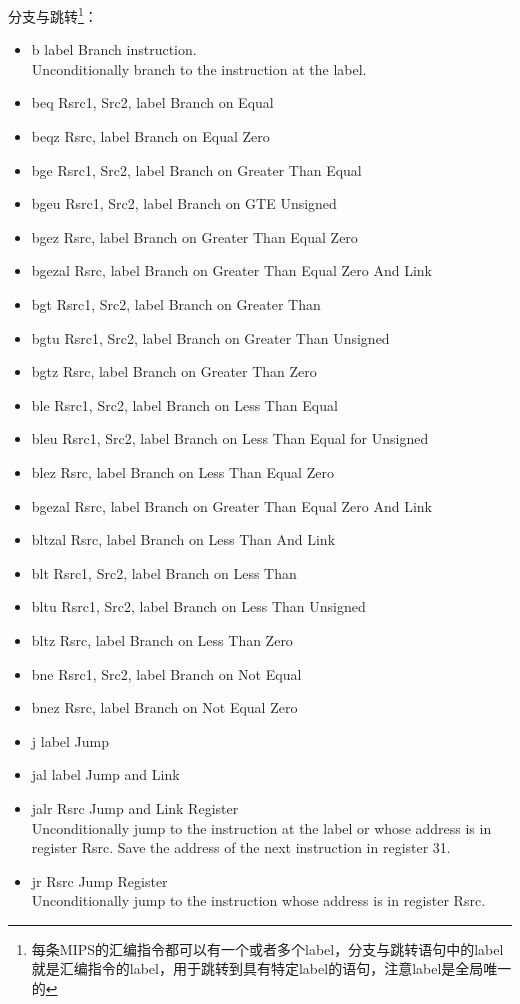 \documentclass[a4paper, 11pt]{article}
\begin{document}
	分支与跳转\footnote{每条MIPS的汇编指令都可以有一个或者多个label，分支与跳转语句中的label就是汇编指令的label，用于跳转到具有特定label的语句，注意label是全局唯一的}：
	\begin{itemize}
		\item b label	\hfill Branch instruction. \\
			Unconditionally branch to the instruction at the label.
		\item beq Rsrc1, Src2, label	\hfill Branch on Equal
		\item beqz Rsrc, label	\hfill Branch on Equal Zero
		\item bge Rsrc1, Src2, label	\hfill Branch on Greater Than Equal
		\item bgeu Rsrc1, Src2, label	\hfill Branch on GTE Unsigned
		\item bgez Rsrc, label	\hfill Branch on Greater Than Equal Zero
		\item bgezal Rsrc, label	\hfill Branch on Greater Than Equal Zero And Link
		\item bgt Rsrc1, Src2, label	\hfill Branch on Greater Than
		\item bgtu Rsrc1, Src2, label	\hfill Branch on Greater Than Unsigned
		\item bgtz Rsrc, label	\hfill Branch on Greater Than Zero
		\item ble Rsrc1, Src2, label	\hfill Branch on Less Than Equal
		\item bleu Rsrc1, Src2, label	\hfill Branch on Less Than Equal for Unsigned
		\item blez Rsrc, label	\hfill Branch on Less Than Equal Zero
		\item bgezal Rsrc, label	\hfill Branch on Greater Than Equal Zero And Link
		\item bltzal Rsrc, label	\hfill Branch on Less Than And Link
		\item blt Rsrc1, Src2, label	\hfill Branch on Less Than
		\item bltu Rsrc1, Src2, label	\hfill Branch on Less Than Unsigned
		\item bltz Rsrc, label	\hfill Branch on Less Than Zero
		\item bne Rsrc1, Src2, label	\hfill Branch on Not Equal
		\item bnez Rsrc, label	\hfill Branch on Not Equal Zero
		\item j label	\hfill Jump
		\item jal label	\hfill Jump and Link
		\item jalr Rsrc	\hfill Jump and Link Register \\
			Unconditionally jump to the instruction at the label or whose address is in register Rsrc. Save the address of the next instruction in register 31.
		\item jr Rsrc	\hfill Jump Register \\
			Unconditionally jump to the instruction whose address is in register Rsrc.
	\end{itemize}
\end{document}
